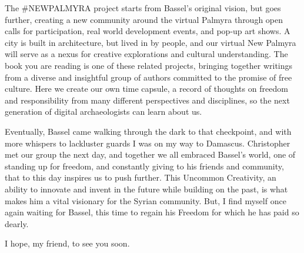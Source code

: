 The \#NEWPALMYRA project starts from Bassel's original vision, but goes
further, creating a new community around the virtual Palmyra through
open calls for participation, real world development events, and pop-up
art shows. A city is built in architecture, but lived in by people, and
our virtual New Palmyra will serve as a nexus for creative explorations
and cultural understanding. The book you are reading is one of these
related projects, bringing together writings from a diverse and
insightful group of authors committed to the promise of free culture.
Here we create our own time capsule, a record of thoughts on freedom and
responsibility from many different perspectives and disciplines, so the
next generation of digital archaeologists can learn about us.

Eventually, Bassel came walking through the dark to that checkpoint, and
with more whispers to lackluster guards I was on my way to Damascus.
Christopher met our group the next day, and together we all embraced
Bassel's world, one of standing up for freedom, and constantly giving to
his friends and community, that to this day inspires us to push further.
This Uncommon Creativity, an ability to innovate and invent in the
future while building on the past, is what makes him a vital visionary
for the Syrian community. But, I find myself once again waiting for
Bassel, this time to regain his Freedom for which he has paid so dearly.

I hope, my friend, to see you soon.
